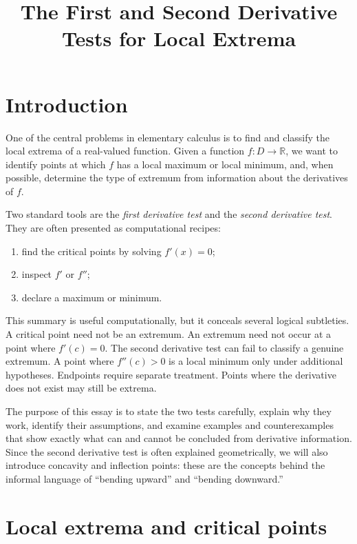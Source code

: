 \documentclass{essay}
\title{The First and Second Derivative Tests for Local Extrema}
\author{}
\date{}
\begin{document}
\maketitle

\section{Introduction}

One of the central problems in elementary calculus is to find and classify the local extrema of a real-valued function. Given a function \(f : D \to \mathbb{R}\), we want to identify points at which \(f\) has a local maximum or local minimum, and, when possible, determine the type of extremum from information about the derivatives of \(f\).

Two standard tools are the \emph{first derivative test} and the \emph{second derivative test}. They are often presented as computational recipes:

\begin{enumerate}
  \item find the critical points by solving \(f'(x)=0\);
  \item inspect \(f'\) or \(f''\);
  \item declare a maximum or minimum.
\end{enumerate}

This summary is useful computationally, but it conceals several logical subtleties. A critical point need not be an extremum. An extremum need not occur at a point where \(f'(c)=0\). The second derivative test can fail to classify a genuine extremum. A point where \(f''(c)>0\) is a local minimum only under additional hypotheses. Endpoints require separate treatment. Points where the derivative does not exist may still be extrema.

The purpose of this essay is to state the two tests carefully, explain why they work, identify their assumptions, and examine examples and counterexamples that show exactly what can and cannot be concluded from derivative information. Since the second derivative test is often explained geometrically, we will also introduce concavity and inflection points: these are the concepts behind the informal language of ``bending upward'' and ``bending downward.''

\section{Local extrema and critical points}
\end{document}
